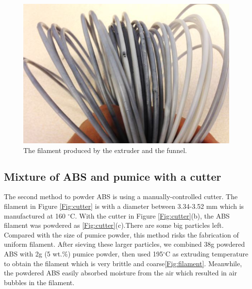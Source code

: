 \begin{figure}[htbp]
  \centering
  \includegraphics[scale=0.65]{Figs5//fail.JPG}
  \caption[The filament produced by the extruder and the funnel]{\footnotesize The filament produced by the extruder and the funnel.}
  \label{Fig:fail}
\end{figure}

\subsection{Mixture of ABS and pumice with a cutter}
The second method to powder ABS is using a manually-controlled cutter. The filament in Figure \ref{Fig:cutter} is with a diameter between 3.34-3.52 mm which is manufactured at 160 $^{\circ}$C. With the cutter in Figure \ref{Fig:cutter}(b), the ABS filament was powdered as \ref{Fig:cutter}(c).There are some big particles left. Compared with the size of pumice powder, this method risks the fabrication of uniform filament. After sieving these larger particles, we combined 38g powdered ABS with 2g (5 wt.$\%$) pumice powder, then used 195$^{\circ}$C as extruding temperature to obtain the filament which is very brittle and coarse\ref{Fig:filament}. Meanwhile, the powdered ABS easily absorbed moisture from the air which resulted in air bubbles in the filament.  

